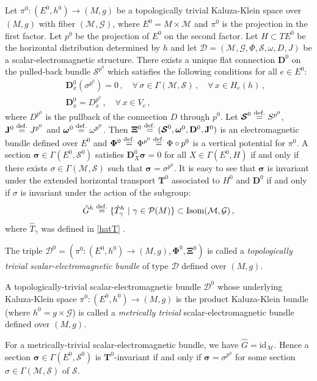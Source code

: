 \documentclass[10pt, cmp, numbook, final, a4paper]{svjour}
\newcommand*{\SavedEqref}{}
\let\SavedEqref\eqref
\renewcommand*{\eqref}[1]{%
  \begingroup
    \hypersetup{
      linkcolor=blue,
      linkbordercolor=blue,
    }%
    \SavedEqref{#1}%
  \endgroup
}
\newcommand{\eqdef}{\stackrel{{\rm def.}}{=}}
\def\bD{\mathbb{D}}
\def\bcD{\boldsymbol{\mathcal{D}}}
\def\bJ{\mathbf{J}}
\def\bomega{\boldsymbol{\omega}}
\def\bJ{\mathbf{J}}
\newcommand{\be}{\begin{equation*}}
\newcommand{\ee}{\end{equation*}}
\newcommand{\beqan}{\begin{eqnarray}}
\newcommand{\eeqan}{\end{eqnarray}}
\newcommand{\nn}{\nonumber}
\newcommand{\id}{\mathrm{id}}
\newcommand{\cM}{\mathcal{M}}
\def\cD{\mathcal{D}}
\def\cP{\mathcal{P}}
\def\cG{\mathcal{G}}
\def\bXi{{\boldsymbol{\Xi}}}
\def\cS{\mathcal{S}}
\def\Isom{\mathrm{Isom}}
\def\mT{\mathbf{T}}
\def\bPhi{\mathbf{\Phi}}
\def\bD{\mathbf{D}}
\def\bomega{\boldsymbol{\omega}}
\def\bcS{\boldsymbol{\mathcal{S}}}
\def\bD{\mathbf{D}}
\def\bsigma{\boldsymbol{\sigma}}
\begin{document}
Let $\pi^0:(E^0,h^{0})\rightarrow (M,g)$ be a topologically trivial
Kaluza-Klein space over $(M,g)$ with fiber $(\cM,\cG)$, where
$E^0=M\times \cM$ and $\pi^0$ is the projection in the first
factor. Let $p^0$ be the projection of $E^0$ on the second factor. Let
$H\subset TE^0$ be the horizontal distribution determined by $h$ and
let $\cD=(\cM,\cG,\Phi,\cS,\omega,D,J)$ be a scalar-electromagnetic
structure.  There exists a unique flat connection $\bD^{0}$ on the
pulled-back bundle $\cS^{p^0}$ which satisfies the following
conditions for all $e\in E^0$:
\beqan
&& \bD^{0}_x(\sigma^{p^0})=0\, , \quad \forall\, \sigma \in \Gamma(\cM,\cS)\, , \quad \forall\, x\in H_e(h)\, ,\nn\\
&& \bD^{0}_x=D^{p^0}_x\, , \quad \forall\, x\in V_{e}\, ,
\eeqan
where $D^{p^0}$ is the pullback of the connection $D$ through
$p^0$. Let $\bcS^0\eqdef S^{p^0}$, $\bJ^0\eqdef J^{p^0}$ and
$\bomega^0\eqdef \omega^{p^0}$. Then $\bXi^{0}\eqdef
(\bcS^0,\bomega^0,\bD^{0},\bJ^0)$ is an electromagnetic bundle defined
over $E^0$ and $\bPhi^0\eqdef \Phi^{p^0}\eqdef \Phi\circ p^0$ is a
vertical potential for $\pi^0$. A section $\bsigma\in
\Gamma(E^0,\bcS^0)$ satisfies $\bD^0_X\bsigma=0$ for all $X\in
\Gamma(E^0,H)$ if and only if there exists $\sigma\in \Gamma(\cM,\cS)$
such that $\bsigma=\sigma^{p^0}$. It is easy to see that $\bsigma$ is
invariant under the extended horizontal transport $\mT^0$ associated
to $H^{0}$ and $\bD^0$ if and only if $\sigma$ is invariant under the
action of the subgroup:
\be
{\hat G}^h\eqdef \{{\hat T}^h_\gamma\,\, |\,\, \gamma\in \cP(M)\}\subset \Isom(\cM,\cG)\, ,
\ee
where ${\hat T}_\gamma$ was defined in \eqref{hatT}. 

\begin{definition}
The triple $\bcD^{0} = (\pi^0:(E^0,h^{0})\rightarrow (M,g),
\bPhi^0,\bXi^{0})$ is called a {\em topologically trivial
  scalar-electromagnetic bundle} of type $\cD$ defined over $(M,g)$.
\end{definition}

\begin{definition}
A topologically-trivial scalar-electromagnetic bundle $\bcD^0$ whose
underlying Kaluza-Klein space $\pi^0:(E^0,h^0)\rightarrow (M,g)$ is
the product Kaluza-Klein bundle (where $h^0=g\times \cG$) is called a
{\em metrically trivial} scalar-electromagnetic bundle defined over
$(M,g)$.
\end{definition}	

\noindent	
For a metrically-trivial scalar-electromagnetic bundle, we have ${\hat
G}=\id_{\cM}$. Hence a section $\bsigma\in \Gamma(E^0,\bcS^0)$ is
$\mT^0$-invariant if and only if $\bsigma=\sigma^{p^0}$ for
some section $\sigma\in \Gamma(\cM,\cS)$ of $\cS$.
\end{document}

